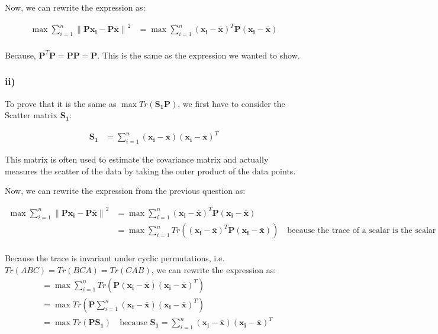 \documentclass[12pt,a4paper,oneside]{paper}
\begin{document}
Now, we can rewrite the expression as:

\begin{align*}
    \max \sum_{i=1}^{n} \left\| \bm{P} \bm{x_i} - \bm{P} \bm{\bar{x}} \right\|^2 &= \max \sum_{i=1}^{n} \left( \bm{x_i} - \bm{\bar{x}} \right)^T \bm{P} \left( \bm{x_i} - \bm{\bar{x}} \right) \\
\end{align*}

Because, $\bm{P}^T \bm{P} = \bm{P} \bm{P} = \bm{P}$. This is the same as the expression we wanted to show.

\subsubsection*{ii)}

To prove that it is the same as $\max Tr(\bm{S_1} \bm{P})$, we first have to consider the Scatter matrix $\bm{S_1}$:

\begin{align*}
    \bm{S_1} &= \sum_{i=1}^{n} \left( \bm{x_i} - \bm{\bar{x}} \right) \left( \bm{x_i} - \bm{\bar{x}} \right)^T
\end{align*}

This matrix is often used to estimate the covariance matrix and actually measures the scatter of the data by
taking the outer product of the data points.

Now, we can rewrite the expression from the previous question as:

\begin{align*}
    \max \sum_{i=1}^{n} \left\| \bm{P} \bm{x_i} - \bm{P} \bm{\bar{x}} \right\|^2 &= \max \sum_{i=1}^{n} \left( \bm{x_i} - \bm{\bar{x}} \right)^T \bm{P} \left( \bm{x_i} - \bm{\bar{x}} \right) \\
    &= \max \sum_{i=1}^{n} Tr \left( \left( \bm{x_i} - \bm{\bar{x}} \right)^T \bm{P} \left( \bm{x_i} - \bm{\bar{x}} \right) \right) \quad {\text{because the trace of a scalar is the scalar itself}} \\
\end{align*}

Because the trace is invariant under cyclic permutations, i.e. $Tr(ABC) = Tr(BCA) = Tr(CAB)$, we can rewrite the expression as:
\begin{align*}
    &= \max \sum_{i=1}^{n} Tr \left( \bm{P} \left( \bm{x_i} - \bm{\bar{x}} \right) \left( \bm{x_i} - \bm{\bar{x}} \right)^T \right) \\
    &= \max Tr \left( \bm{P} \sum_{i=1}^{n} \left( \bm{x_i} - \bm{\bar{x}} \right) \left( \bm{x_i} - \bm{\bar{x}} \right)^T \right) \\
    &= \max Tr \left( \bm{P} \bm{S_1} \right) \quad {\text{because $\bm{S_1} = \sum_{i=1}^{n} \left( \bm{x_i} - \bm{\bar{x}} \right) \left( \bm{x_i} - \bm{\bar{x}} \right)^T$}} \\
\end{align*}
\end{document}
